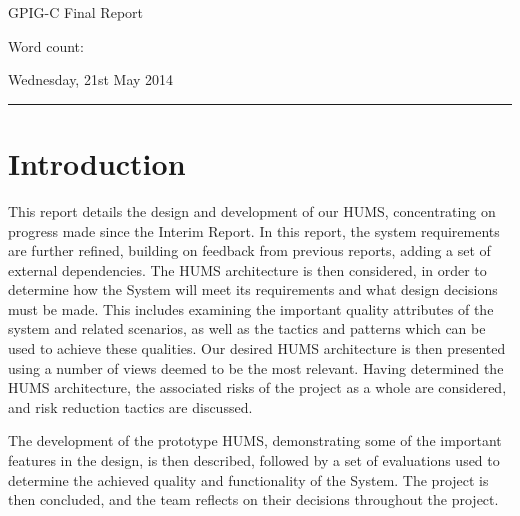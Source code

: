 \documentclass[10pt,a4paper]{article}
\begin{document}
\begin{center}
{\vspace*{-0.5cm}
\Huge GPIG-C Final Report}
\vspace*{0.2cm}

Word count: %
\vspace*{0.1cm}

Wednesday, 21st May 2014
\end{center}
\vspace*{0.4cm}
\hrule
\vspace*{0.4cm}

\section{Introduction}
\label{sec:intro}
This report details the design and development of our HUMS, concentrating on progress made since the Interim Report. In this report, the system requirements are further refined, building on feedback from previous reports, adding a set of external dependencies. The HUMS architecture is then considered, in order to determine how the System will meet its requirements and what design decisions must be made. This includes examining the important quality attributes of the system and related scenarios, as well as the tactics and patterns which can be used to achieve these qualities. Our desired HUMS architecture is then presented using a number of views deemed to be the most relevant. Having determined the HUMS architecture, the associated risks of the project as a whole are considered, and risk reduction tactics are discussed.

The development of the prototype HUMS, demonstrating some of the important features in the design, is then described, followed by a set of evaluations used to determine the achieved quality and functionality of the System. The project is then concluded, and the team reflects on their decisions throughout the project.

\end{document}
